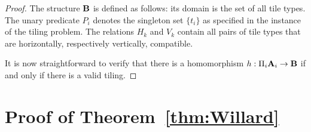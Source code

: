 \documentclass{article}
\newcommand{\aest}{{\bf A}}
\newcommand{\best}{{\bf B}}
\begin{document}
\begin{proof}
   The structure $\best$ is defined as follows:
   its domain is the set of all tile types. The unary predicate $P_i$ 
  denotes the singleton set $\{t_i\}$ as specified in the instance of the tiling problem.
   The relations $H_k$ and $V_k$ contain all pairs of tile types that are horizontally,
    respectively vertically, compatible.

    It is now straightforward to verify that there is a homomorphism $h:\Pi_i \aest_i \to \best$
   if and only if there is a valid tiling.
\end{proof}




\section{Proof of Theorem~\ref{thm:Willard}}
\end{document}
